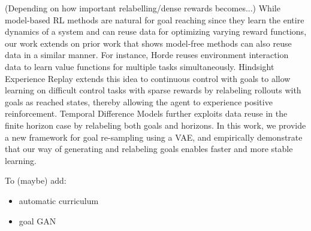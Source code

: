 (Depending on how important relabelling/dense rewards becomes...)
While model-based RL methods are natural for goal reaching since they learn the entire dynamics of a system and can reuse data for optimizing varying reward functions, our work extends on prior work that shows model-free methods can also reuse data in a similar manner.
For instance, Horde \cite{sutton2011horde} reuses environment interaction data to learn value functions for multiple tasks simultaneously.
Hindsight Experience Replay \cite{andrychowicz2017her} extends this idea to continuous control with goals \cite{schaul2015uva} to allow learning on difficult control tasks with sparse rewards by relabeling rollouts with goals as reached states, thereby allowing the agent to experience positive reinforcement.
Temporal Difference Models \cite{pong2018tdm} further exploits data reuse in the finite horizon case by relabeling both goals and horizons.
In this work, we provide a new framework for goal re-sampling using a VAE, and empirically demonstrate that our way of generating and relabeling goals enables faster and more stable learning.

To (maybe) add:
\begin{itemize}
    \item automatic curriculum
    \item goal GAN
\end{itemize}





